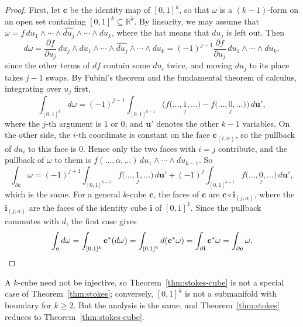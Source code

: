 \documentclass[11pt]{article}
\theoremstyle{definition}
\theoremstyle{plain}
\theoremstyle{remark}
\begin{document}
\begin{proof}
    First, let $\mathbf{c}$ be the identity map of $[0, 1]^k$, so that $\omega$ is a $(k - 1)$-form on an open set containing $[0, 1]^k \subseteq \mathbb{R}^k$. By linearity, we may assume that $\omega = f\, du_1 \wedge \cdots \wedge \widehat{du_j} \wedge \cdots \wedge du_k$, where the hat means that $du_j$ is left out. Then
    \[d\omega = \frac{\partial f}{\partial u_j}\, du_j \wedge du_1 \wedge \cdots \wedge \widehat{du_j} \wedge \cdots \wedge du_k = (-1)^{j-1}\frac{\partial f}{\partial u_j}\, du_1 \wedge \cdots \wedge du_k,\]
    since the other terms of $df$ contain some $du_i$ twice, and moving $du_j$ to its place takes $j - 1$ swaps. By Fubini's theorem and the fundamental theorem of calculus, integrating over $u_j$ first,
    \[\int_{[0,1]^k} d\omega = (-1)^{j-1} \int_{[0,1]^{k-1}} \Big(f\big(\ldots, \underset{j}{1}, \ldots\big) - f\big(\ldots, \underset{j}{0}, \ldots\big)\Big)\, d\mathbf{u}',\]
    where the $j$-th argument is $1$ or $0$, and $\mathbf{u}'$ denotes the other $k - 1$ variables. On the other side, the $i$-th coordinate is constant on the face $\mathbf{c}_{(i, \alpha)}$, so the pullback of $du_i$ to this face is $0$. Hence only the two faces with $i = j$ contribute, and the pullback of $\omega$ to them is $f(\ldots, \alpha, \ldots)\, du_1 \wedge \cdots \wedge du_{k-1}$. So
    \[\int_{\partial\mathbf{c}} \omega = (-1)^{j+1} \int_{[0,1]^{k-1}} f\big(\ldots, \underset{j}{1}, \ldots\big)\, d\mathbf{u}' + (-1)^j \int_{[0,1]^{k-1}} f\big(\ldots, \underset{j}{0}, \ldots\big)\, d\mathbf{u}',\]
    which is the same. For a general $k$-cube $\mathbf{c}$, the faces of $\mathbf{c}$ are $\mathbf{c} \circ \mathbf{i}_{(j, \alpha)}$, where the $\mathbf{i}_{(j, \alpha)}$ are the faces of the identity cube $\mathbf{i}$ of $[0, 1]^k$. Since the pullback commutes with $d$, the first case gives
    \[\int_{\mathbf{c}} d\omega = \int_{[0,1]^k} \mathbf{c}^*(d\omega) = \int_{[0,1]^k} d(\mathbf{c}^*\omega) = \int_{\partial\mathbf{i}} \mathbf{c}^*\omega = \int_{\partial\mathbf{c}} \omega. \qedhere\]
\end{proof}

A $k$-cube need not be injective, so Theorem~\ref{thm:stokes-cube} is not a special case of Theorem~\ref{thm:stokes}; conversely, $[0, 1]^k$ is not a submanifold with boundary for $k \geq 2$. But the analysis is the same, and Theorem~\ref{thm:stokes} reduces to Theorem~\ref{thm:stokes-cube}.
\end{document}
